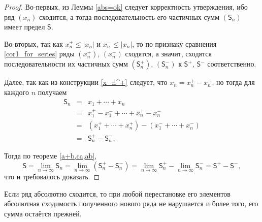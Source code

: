 \begin{proof}\label{S=S^+-S^-}
 Во-первых, из Леммы \ref{abs=ok} следует корректность утверждения, ибо ряд $(x_n)$ сходится, а тогда последовательность его частичных сумм $(\mathsf{S}_n)$ имеет предел $\mathsf{S}.$

Во-вторых, так как $x_n^+ \le |x_n|$ и $x_n^- \le |x_n|$, то по признаку сравнения \ref{cor1_for_series} ряды $(x_n^+)$, $(x_n^-)$ сходятся, а значит, сходятся последовательности их частичных сумм $(\mathsf{S}_n^+)$, $(\mathsf{S}_n^-)$ к $\mathsf{S}^+$, $\mathsf{S}^-$ соответственно.

Далее, так как из конструкции \ref{x_n^+} следует, что $x_n = x_n^+- x_n^-$, но тогда для каждого $n$ получаем
\begin{eqnarray*}
     \mathsf{S}_n  &=& x_1 + \cdots + x_n \\
     &=& x_1^+ - x_1^- + \cdots + x_n^+ - x_n^- \\
     &=& \left( x_1^+ + \cdots + x_n^+ \right) - \left(x_1^- + \cdots + x_n^- \right) \\
     &=& \mathsf{S}_n^+ - \mathsf{S}_n^-.
\end{eqnarray*}

Тогда по теореме \ref{a+b,ca,ab}, 
\[
 \mathsf{S} = \lim_{n \to \infty} \mathsf{S}_n = \lim_{n\to \infty}(\mathsf{S}_n^+ - \mathsf{S}_n^-) = \lim_{n\to \infty} \mathsf{S}_n^+ - \lim_{n\to \infty}\mathsf{S}_n^- = \mathsf{S}^+ - \mathsf{S}^-,
\]
что и требовалось доказать. 
\end{proof}

\begin{proposition}
    Если ряд абсолютно сходится, то при любой перестановке его элементов абсолютная сходимость полученного нового ряда не нарушается и более того, его сумма остаётся прежней.
\end{proposition}

